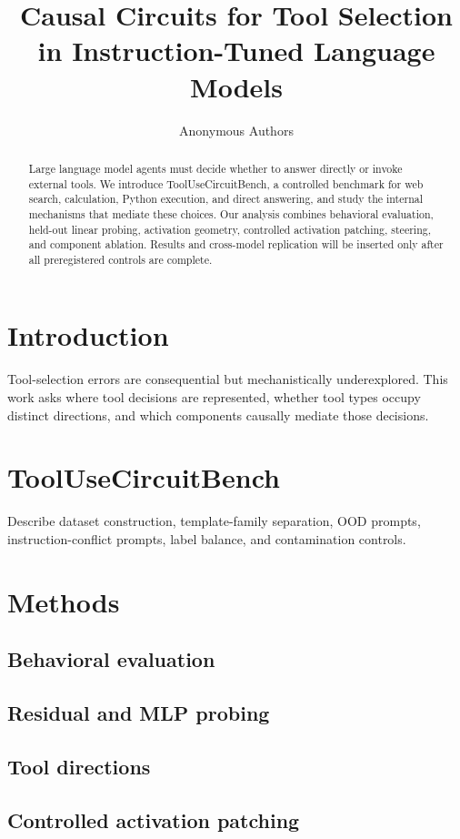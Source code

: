 \documentclass[11pt]{article}
\title{Causal Circuits for Tool Selection in Instruction-Tuned Language Models}
\author{Anonymous Authors}
\date{}
\begin{document}
\maketitle

\begin{abstract}
Large language model agents must decide whether to answer directly or invoke
external tools. We introduce ToolUseCircuitBench, a controlled benchmark for
web search, calculation, Python execution, and direct answering, and study the
internal mechanisms that mediate these choices. Our analysis combines
behavioral evaluation, held-out linear probing, activation geometry,
controlled activation patching, steering, and component ablation. Results and
cross-model replication will be inserted only after all preregistered controls
are complete.
\end{abstract}

\section{Introduction}
Tool-selection errors are consequential but mechanistically underexplored.
This work asks where tool decisions are represented, whether tool types occupy
distinct directions, and which components causally mediate those decisions.

\section{ToolUseCircuitBench}
Describe dataset construction, template-family separation, OOD prompts,
instruction-conflict prompts, label balance, and contamination controls.

\section{Methods}
\subsection{Behavioral evaluation}
\subsection{Residual and MLP probing}
\subsection{Tool directions}
\subsection{Controlled activation patching}
\end{document}
